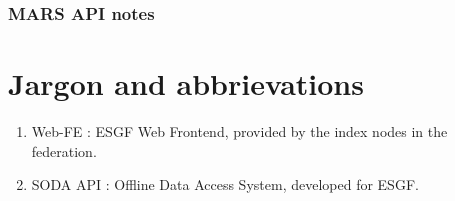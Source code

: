 \documentclass[oneside,12pt]{memoir}
\def\phname{SODA API{ }}
\begin{document}
\subsection{MARS API notes}

\appendix
{}
\setcounter{secnumdepth}{0}
\chapter{Jargon and abbrievations}
\begin{enumerate}
\item Web-FE : ESGF Web Frontend, provided by the index nodes in the federation.
\item \phname: Offline Data Access System, developed for ESGF. 
\end{enumerate}
\hypertarget{mymarker}{}
\printindex
\end{document}
